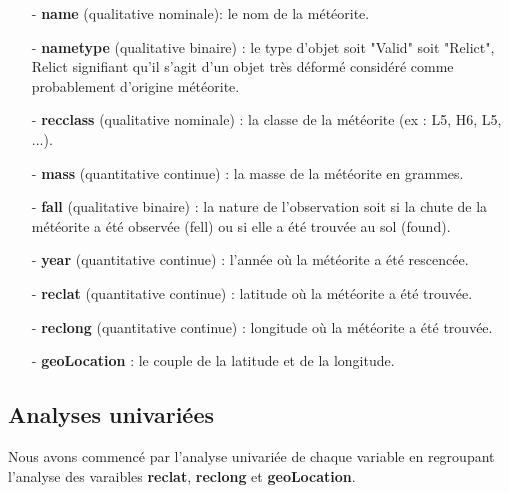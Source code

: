 \documentclass[12pt]{article}
\begin{document}
{\setlength{\baselineskip}{1.5\baselineskip}
\begin{itemize}
\item[-] \textbf{name} (qualitative nominale): le nom de la météorite.
\item[-] \textbf{nametype} (qualitative binaire) : le type d'objet soit "Valid" soit "Relict", Relict signifiant qu'il s'agit d'un objet très déformé considéré comme probablement d'origine météorite.
\item[-] \textbf{recclass} (qualitative nominale) : la classe de la météorite (ex : L5, H6, L5, ...).
\item[-] \textbf{mass} (quantitative continue) : la masse de la météorite en grammes.
\item[-] \textbf{fall} (qualitative binaire) : la nature de l'observation soit si la chute de la météorite a été observée (fell) ou si elle a été trouvée au sol (found).
\item[-] \textbf{year} (quantitative continue) : l'année où la météorite a été rescencée.
\item[-] \textbf{reclat} (quantitative continue) : latitude où la météorite a été trouvée.
\item[-] \textbf{reclong} (quantitative continue) : longitude où la météorite a été trouvée.
\item[-]\textbf{geoLocation} : le couple de la latitude et de la longitude.\\
\end{itemize}
}

\subsection{Analyses univariées}
Nous avons commencé par l'analyse univariée de chaque variable en regroupant l'analyse des varaibles \textbf{reclat}, \textbf{reclong} et \textbf{geoLocation}. 
\\
\end{document}
